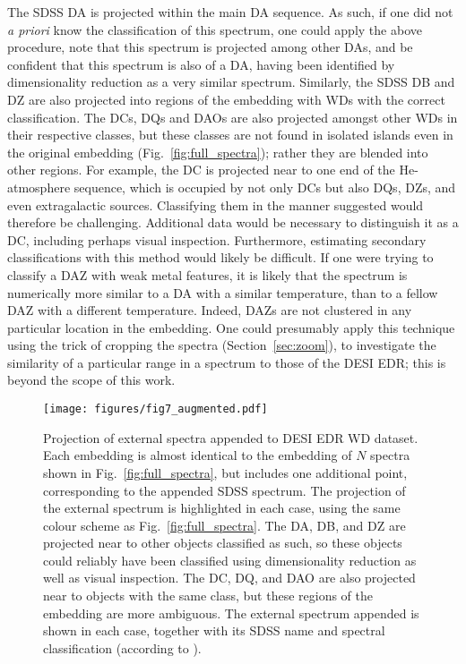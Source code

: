 \documentclass[fleqn,usenatbib]{mnras}
\begin{document}
The SDSS DA is projected within the main DA sequence.
As such, if one did not \textit{a priori} know the classification of this spectrum, one could apply the above procedure, note that this spectrum is projected among other DAs, and be confident that this spectrum is also of a DA, having been identified by dimensionality reduction as a very similar spectrum.
Similarly, the SDSS DB and DZ are also projected into regions of the embedding with WDs with the correct classification.
The DCs, DQs and DAOs are also projected amongst other WDs in their respective classes, but these classes are not found in isolated islands even in the original embedding (Fig.~\ref{fig:full_spectra}); rather they are blended into other regions.
For example, the DC is projected near to one end of the He-atmosphere sequence, which is occupied by not only DCs but also DQs, DZs, and even extragalactic sources.
Classifying them in the manner suggested would therefore be challenging.
Additional data would be necessary to distinguish it as a DC, including perhaps visual inspection.
Furthermore, estimating secondary classifications with this method would likely be difficult.
If one were trying to classify a DAZ with weak metal features, it is likely that the spectrum is numerically more similar to a DA with a similar temperature, than to a fellow DAZ with a different temperature.
Indeed, DAZs are not clustered in any particular location in the embedding.
One could presumably apply this technique using the trick of cropping the spectra (Section~\ref{sec:zoom}), to investigate the similarity of a particular range in a  spectrum to those of the DESI EDR; this is beyond the scope of this work.

\begin{figure*}
\texttt{[image: figures/fig7\_augmented.pdf]}
\caption{
    Projection of external spectra appended to DESI EDR WD dataset.
    Each embedding is almost identical to the embedding of $N$ spectra shown in Fig.~\ref{fig:full_spectra}, but includes one additional point, corresponding to the appended SDSS spectrum.
    The projection of the external spectrum is highlighted in each case, using the same colour scheme as Fig.~\ref{fig:full_spectra}.
    The DA, DB, and DZ are projected near to other objects classified as such, so these objects could reliably have been classified using dimensionality reduction as well as visual inspection.
    The DC, DQ, and DAO are also projected near to objects with the same class, but these regions of the embedding are more ambiguous.
    The external spectrum appended is shown in each case, together with its SDSS name and spectral classification (according to \citealt{gentilefusillo19}).
}
\label{fig:external_spectra}
\end{figure*}
\end{document}
